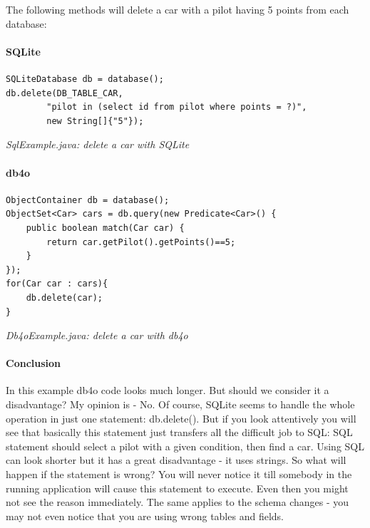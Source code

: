 The following methods will delete a car with a pilot having 5 points from each database:

\paragraph*{SQLite}

\begin{lstlisting}
SQLiteDatabase db = database();
db.delete(DB_TABLE_CAR,
        "pilot in (select id from pilot where points = ?)",
        new String[]{"5"});
\end{lstlisting}

{\small\itshape SqlExample.java: delete a car with SQLite\par}
\medskip

\paragraph*{db4o}

\begin{lstlisting}
ObjectContainer db = database();
ObjectSet<Car> cars = db.query(new Predicate<Car>() {
    public boolean match(Car car) {
        return car.getPilot().getPoints()==5;
    }            
});
for(Car car : cars){
    db.delete(car);
}
\end{lstlisting}

{\small\itshape Db4oExample.java: delete a car with db4o\par}
\medskip

\paragraph*{Conclusion}

In this example db4o code looks much longer. But should we consider it a disadvantage? My opinion is - No. Of course, SQLite seems to handle the whole operation in just one statement: db.delete(). But if you look attentively you will see that basically this statement just transfers all the difficult job to SQL: SQL statement should select a pilot with a given condition, then find a car. Using SQL can look shorter but it has a great disadvantage - it uses strings. So what will happen if the statement is wrong? You will never notice it till somebody in the running application will cause this statement to execute. Even then you might not see the reason immediately. The same applies to the schema changes - you may not even notice that you are using wrong tables and fields.

